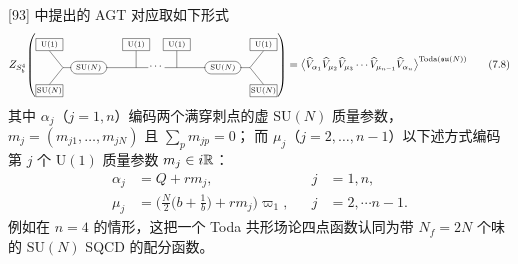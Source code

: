 [93] 中提出的 AGT 对应取如下形式
\begin{equation}
Z_{S^4_b}\!\left(
\begin{tikzpicture}[baseline=(current bounding box.center),scale=0.9,
  qnd/.style={draw,rounded corners=2.2mm,minimum height=4.2mm,minimum width=12mm,inner sep=1pt,font=\scriptsize},
  qbx/.style={draw,minimum height=4.0mm,minimum width=9mm,inner sep=1pt,font=\scriptsize}]
\node[qnd] (n1) at (0,0) {$\mathrm{SU}(N)$};
\node[qbx] (u1) at (-1.45,0.85) {$\mathrm{U}(1)$};
\node[qbx] (s1) at (-1.45,-0.85) {$\mathrm{SU}(N)$};
\coordinate (f1) at (-0.95,0);
\draw (n1.west) -- (f1);
\draw (f1) -- (u1.south);
\draw (f1) -- (s1.north);
\node[qnd] (n2) at (4.95,0) {$\mathrm{SU}(N)$};
\draw (n1.east) -- (2.2,0);
\draw (2.8,0) -- (n2.west);
\node at (2.5,0.05) {$\cdots$};
\node[qbx] (u2) at (1.75,0.85) {$\mathrm{U}(1)$};
\draw (u2.south) -- (1.75,0);
\node[qbx] (u3) at (3.25,0.85) {$\mathrm{U}(1)$};
\draw (u3.south) -- (3.25,0);
\node[qbx] (u4) at (6.45,0.85) {$\mathrm{U}(1)$};
\node[qbx] (s2) at (6.45,-0.85) {$\mathrm{SU}(N)$};
\coordinate (f2) at (5.95,0);
\draw (n2.east) -- (f2);
\draw (f2) -- (u4.south);
\draw (f2) -- (s2.north);
\end{tikzpicture}
\right)
=\big\langle\widehat{V}_{\alpha_1}\widehat{V}_{\mu_2}\widehat{V}_{\mu_3}\cdots
\widehat{V}_{\mu_{n-1}}\widehat{V}_{\alpha_n}\big\rangle^{\mathrm{Toda}(\fsu(N))}
\tag{7.8}
\end{equation}
其中 $\alpha_j$（$j=1,n$）编码两个满穿刺点的虚 $\mathrm{SU}(N)$ 质量参数，
$m_j=(m_{j1},\dots,m_{jN})$ 且 $\sum_p m_{jp}=0$；
而 $\mu_j$（$j=2,\dots,n-1$）以下述方式编码第 $j$ 个 $\mathrm{U}(1)$ 质量参数 $m_j\in i\mathbb{R}$：
\begin{equation}
\begin{aligned}
\alpha_j&=Q+rm_j, && j&=1,n,\\
\mu_j&=\Big(\frac{N}{2}\big(b+\frac{1}{b}\big)+rm_j\Big)\varpi_1, && j&=2,\cdots n-1.
\end{aligned}
\tag{7.9}
\end{equation}
例如在 $n=4$ 的情形，这把一个 Toda 共形场论四点函数认同为带 $N_f=2N$ 个味的 $\mathrm{SU}(N)$ SQCD 的配分函数。


